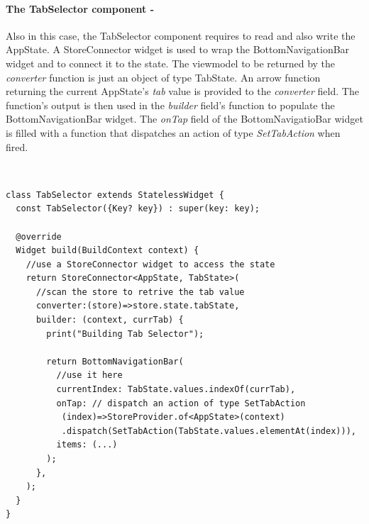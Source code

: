 \paragraph{The TabSelector component - }
\label{subpar:todo_app_bloc_core_state}
Also in this case, the TabSelector component requires to read and also write the AppState. A StoreConnector widget is used to wrap the BottomNavigationBar widget and to connect it to the state. The viewmodel to be returned by the \textit{converter} function is just an object of type TabState. An arrow function returning the current AppState’s \textit{tab} value is provided to the \textit{converter} field. The function's output is then used in the \textit{builder} field's function to populate the BottomNavigationBar widget. The \textit{onTap} field of the BottomNavigatioBar widget is filled with a function that dispatches an action of type \textit{SetTabAction} when fired.
\begin{code}
\mbox{}\\
 \mbox{}
		\label{code:2.14}
\begin{verbatim}
class TabSelector extends StatelessWidget {
  const TabSelector({Key? key}) : super(key: key);

  @override
  Widget build(BuildContext context) {
    //use a StoreConnector widget to access the state
    return StoreConnector<AppState, TabState>(
      //scan the store to retrive the tab value
      converter:(store)=>store.state.tabState,
      builder: (context, currTab) {
        print("Building Tab Selector");

        return BottomNavigationBar(
          //use it here
          currentIndex: TabState.values.indexOf(currTab),
          onTap: // dispatch an action of type SetTabAction
           (index)=>StoreProvider.of<AppState>(context)
           .dispatch(SetTabAction(TabState.values.elementAt(index))),
          items: (...)
        );
      },
    );
  }
}
\end{verbatim}
\mbox{}
\end{code}

